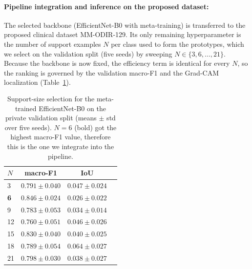 \documentclass[runningheads]{llncs}
\begin{document}
\paragraph{Pipeline integration and inference on the proposed dataset:}
The selected backbone (EfficientNet-B0 with meta-training) is transferred to the proposed clinical dataset MM-ODIR-129. Its only remaining hyperparameter is the number of support examples $N$ per class used to form the prototypes, which we select on the validation split (five seeds) by sweeping $N\in\{3,6,\dots,21\}$. Because the backbone is now fixed, the efficiency term is identical for every $N$, so the ranking is governed by the validation macro-F1 and the Grad-CAM localization (Table~\ref{tab:nshot}). \\

\begin{table}[t]
\centering
\caption{Support-size selection for the meta-trained EfficientNet-B0 on the private
validation split (means $\pm$ std over five seeds). $N=6$ (bold) got the highest macro-F1 value, therefore this is the one we integrate into the pipeline.}
\label{tab:nshot}
\begin{tabular}{lccc}
\toprule
$N$ & macro-F1 & IoU \\
\midrule
3           & $0.791\pm0.040$          & $0.047\pm0.024$ \\
\textbf{6}  & $\mathbf{0.846\pm0.024}$ & $0.026\pm0.022$ \\
9           & $0.783\pm0.053$          & $0.034\pm0.014$ \\
12          & $0.760\pm0.051$          & $0.046\pm0.026$ \\
15          & $0.830\pm0.040$          & $0.040\pm0.025$ \\
18          & $0.789\pm0.054$          & $0.064\pm0.027$ \\
21          & $0.798\pm0.030$          & $0.038\pm0.027$ \\
\bottomrule
\end{tabular}
\end{table}
\end{document}
